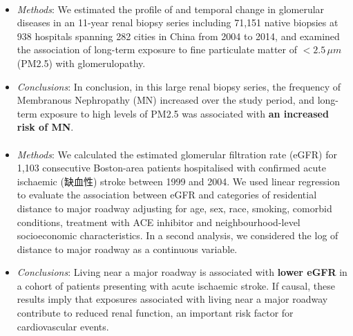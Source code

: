 \documentclass{article}
\begin{document}
\paragraph{\citet{xu2016long}}
\begin{itemize}
    \item \textit{Methods}: We estimated the profile of and temporal change in glomerular diseases in an 11-year renal biopsy series including 71,151 native biopsies at 938 hospitals spanning 282 cities in China from 2004 to 2014, and examined the association of long-term exposure to fine particulate matter of $<2.5\,\mu m$ (PM2.5) with glomerulopathy. 
    \item \textit{Conclusions}: In conclusion, in this large renal biopsy series, the frequency of Membranous Nephropathy (MN) increased over the study period, and long-term exposure to high levels of PM2.5 was associated with \textbf{an increased risk of MN}.
\end{itemize}

\paragraph{\citet{lue2013residential}}
\begin{itemize}
    \item \textit{Methods}: We calculated the estimated glomerular filtration rate (eGFR) for 1,103 consecutive Boston-area patients hospitalised with confirmed acute ischaemic (缺血性) stroke between 1999 and 2004. We used linear regression to evaluate the association between eGFR and categories of residential distance to major roadway adjusting for age, sex, race, smoking, comorbid conditions, treatment with ACE inhibitor and neighbourhood-level socioeconomic characteristics. In a second analysis, we considered the log of distance to major roadway as a continuous variable.
    \item \textit{Conclusions}: Living near a major roadway is associated with \textbf{lower eGFR} in a cohort of patients presenting with acute ischaemic stroke. If causal, these results imply that exposures associated with living near a major roadway contribute to reduced renal function, an important risk factor for cardiovascular events.
\end{itemize}
\end{document}
